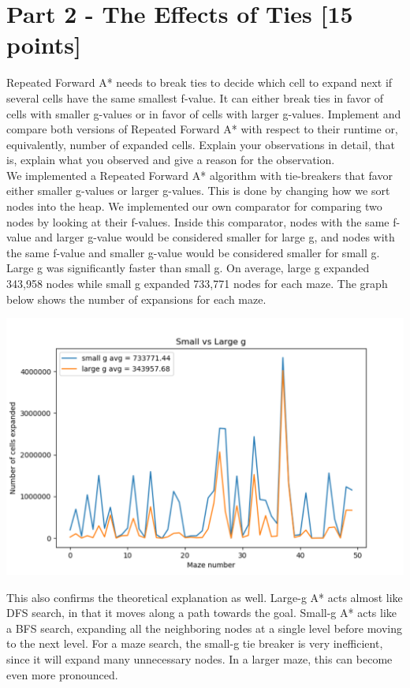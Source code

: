 \documentclass[a4paper]{article}
\theoremstyle{definition}
\theoremstyle{plain}
\begin{document}
\section*{Part 2 - The Effects of Ties [15 points]}
Repeated Forward A* needs to break ties to decide which cell to expand next if several cells have the same smallest f-value. It can either break ties in favor of cells with smaller g-values or in favor of cells with larger g-values. Implement and compare both versions of Repeated Forward A* with respect to their runtime or, equivalently, number of expanded cells. Explain your observations in detail, that is, explain what you observed and give a reason for the observation. \\We implemented a Repeated Forward A* algorithm with tie-breakers that favor either smaller g-values or larger g-values. This is done by changing how we sort nodes into the heap. We implemented our own comparator for comparing two nodes by looking at their f-values. Inside this comparator, nodes with the same f-value and larger g-value would  be considered smaller for large g, and nodes with the same f-value and smaller g-value would be considered smaller for small g. \\ Large g was significantly faster than small g. On average, large g expanded 343,958 nodes while small g expanded 733,771 nodes for each maze. The graph below shows the number of expansions for each maze. 
\begin{center}
\includegraphics[scale=.7]{part2graph.PNG}
\end{center}
This also confirms the theoretical explanation as well. Large-g A* acts almost like DFS search, in that it moves along a path towards the goal. Small-g A* acts like a BFS search, expanding all the neighboring nodes at a single level before moving to the next level. For a maze search, the small-g tie breaker is very inefficient, since it will expand many unnecessary nodes. In a larger maze, this can become even more pronounced. 
\end{document}
